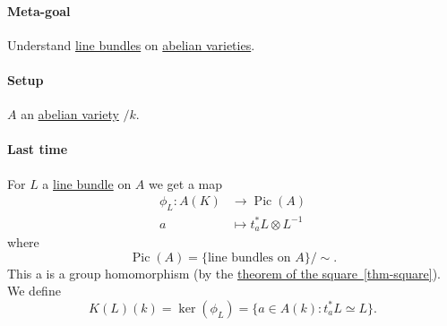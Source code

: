 \documentclass[10pt,]{book}
\numberwithin{equation}{section}
\DeclareMathOperator{\Pic}{Pic}
\newcommand{\amp}{&}
\begin{document}
\paragraph[{Meta-goal}]{Meta-goal}\hypertarget{paragraphs-1}{}
\hypertarget{p-163}{}%
Understand \hyperref[def-line-bundle]{line bundles} on \hyperref[def-buntes-abvar]{abelian varieties}.%
%
%
\typeout{************************************************}
\typeout{************************************************}
%
\paragraph[{Setup}]{Setup}\hypertarget{paragraphs-2}{}
\hypertarget{p-164}{}%
\(A\) an \hyperref[def-buntes-abvar]{abelian variety} \(/k\).%
%
%
\typeout{************************************************}
\typeout{************************************************}
%
\paragraph[{Last time}]{Last time}\hypertarget{paragraphs-3}{}
\hypertarget{p-165}{}%
For \(L\) a \hyperref[def-line-bundle]{line bundle} on \(A\) we get a map%
\begin{align*}
\phi_L\colon A(K) \amp\to \Pic(A)\\
a\amp\mapsto t_a^* L\otimes L^{-1}
\end{align*}
where%
\begin{equation*}
\Pic(A) = \{\text{line bundles on } A\}/\sim\text{.}
\end{equation*}
This a is a group homomorphism (by the \hyperref[thm-square]{theorem of the square~\ref{thm-square}}). We define%
\begin{equation*}
K(L)(k) = \ker(\phi_L) = \{a\in A(k) : t_a^* L \simeq L\}\text{.}
\end{equation*}
%
%
%
\typeout{************************************************}
\typeout{************************************************}
%
\end{document}
